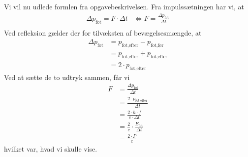 \documentclass{report}
\begin{document}
Vi vil nu udlede formlen fra opgavebeskrivelsen.
Fra impulssætningen har vi, at 
\begin{equation*}
\begin{split}
  \Delta p_{\text{fot} }=F \cdot \Delta t &\iff F=\frac{\Delta p_{\text{fot} }}{\Delta t}\\
\end{split}
\end{equation*}
Ved refleksion gælder der for tilvæksten af bevægelsesmængde, at 
\begin{equation*}
\begin{split}
  \Delta p_{\text{fot} }&=p _{\text{fot,efter} }-p _{\text{fot,før} }\\
  &=p _{\text{fot,efter} }+p _{\text{fot,efter} }\\
  &=2 \cdot p _{\text{fot,efter} }
\end{split}
\end{equation*}
Ved at sætte de to udtryk sammen, får vi 
\begin{equation*}
\begin{split}
  F&=\frac{\Delta p_{\text{fot} }}{\Delta t}\\
  &=\frac{2 \cdot p _{\text{fot,efter} }}{\Delta t}\\
  &=\frac{2 \cdot h \cdot f}{ c\cdot \Delta t}\\
  &=\frac{2 }{c } \cdot \frac{ E _{\text{fot} }}{ \Delta t}\\
  &=\frac{2 \cdot P}{c}
\end{split}
\end{equation*}
hvilket var, hvad vi skulle vise.
\end{document}
